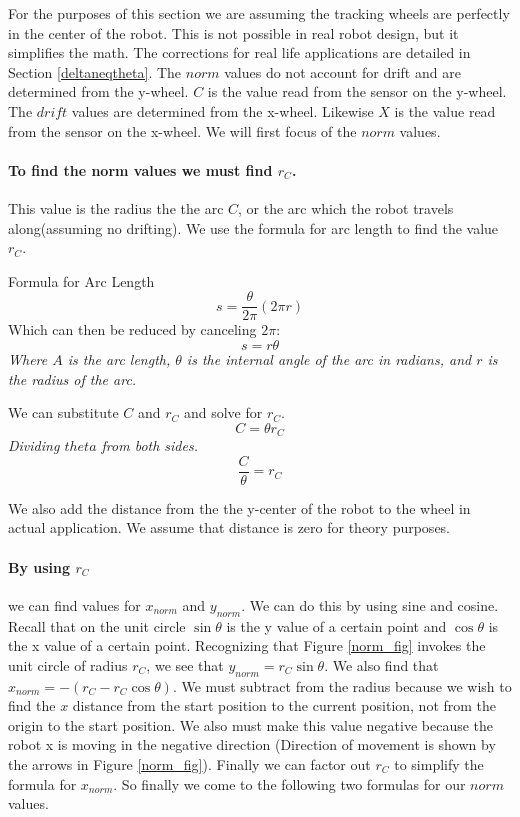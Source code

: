 \documentclass[12pt]{article}
\begin{document}
For the purposes of this section we are assuming the tracking wheels are perfectly in the center of the robot. This is not possible in real robot design, but it simplifies the math. The corrections for real life applications are detailed in Section \ref{deltaneqtheta}. The $norm$ values do not account for drift and are determined from the y-wheel. $C$ is the value read from the sensor on the y-wheel. The $drift$ values are determined from the x-wheel. Likewise $X$ is the value read from the sensor on the x-wheel. We will first focus of the $norm$ values.
\paragraph{To find the norm values we must find $r_C$.} This value is the radius the the arc $C$, or the arc which the robot travels along(assuming no drifting). We use the formula for arc length to find the value $r_C$.

\centering
Formula for Arc Length
$$ s = \frac{\theta}{2\pi} (2\pi r) $$
Which can then be reduced by canceling $2\pi$:
$$ s = r\theta $$
\textit{Where $A$ is the arc length, $\theta$ is the internal angle of the arc in radians, and $r$ is the radius of the arc.}

We can substitute $C$ and $r_C$ and solve for $r_C$.
$$ C = \theta r_C $$
\textit{Dividing $theta$ from both sides.}
$$ \frac{C}{\theta} = r_C $$

\raggedright
We also add the distance from the the y-center of the robot to the wheel in actual application. We assume that distance is zero for theory purposes.

\paragraph{By using $r_C$} we can find values for $x_{norm}$ and $y_{norm}$. We can do this by using sine and cosine. Recall that on the unit circle $\sin\theta$ is the y value of a certain point and $\cos\theta$ is the x value of a certain point. Recognizing that Figure \ref{norm_fig} invokes the unit circle of radius $r_C$, we see that $y_{norm} = r_C \sin\theta$. We also find that $x_{norm} = -(r_C - r_C \cos\theta)$. We must subtract from the radius because we wish to find the $x$ distance from the start position to the current position, not from the origin to the start position. We also must make this value negative because the robot x is moving in the negative direction (Direction of movement is shown by the arrows in Figure \ref{norm_fig}). Finally we can factor out $r_C$ to simplify the formula for $x_{norm}$. So finally we come to the following two formulas for our $norm$ values.
\end{document}
